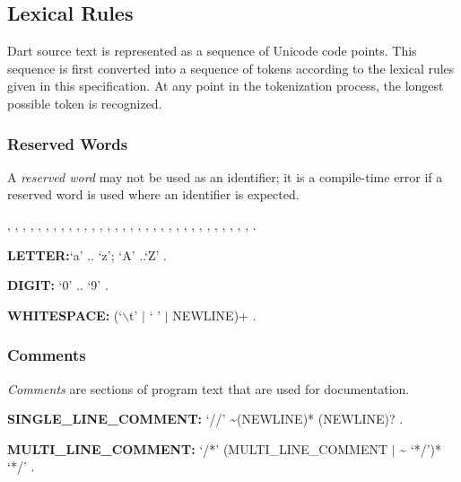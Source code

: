 \documentclass{article}
\begin{document}
\subsection{Lexical Rules}

\LMHash{}
Dart source text is represented as a sequence of Unicode code points.  This sequence is first converted into a sequence of tokens according to the lexical rules given in this specification.  At any point in the tokenization process, the longest possible token is recognized.

\subsubsection{Reserved Words} 

\LMHash{}
A {\em reserved word} may not be used as an identifier; it is a compile-time error if a reserved word is used where an identifier is expected.

\ASSERT{}, \BREAK{}, \CASE{}, \CATCH{}, \CLASS{}, \CONST{}, \CONTINUE{}, \DEFAULT{}, \DO{}, \ELSE{}, \ENUM{}, \EXTENDS{}, \FALSE{}, \FINAL{}, \FINALLY{}, \FOR{}, \IF{}, \IN{}, \IS{}, \NEW{}, \NULL{}, \RETHROW, \RETURN{}, \SUPER{}, \SWITCH{}, \THIS{}, \THROW{}, \TRUE{}, \TRY{}, \VAR{}, \VOID{}, \WHILE{}, \WITH{}.




\begin{grammar}
 {\bf LETTER:}`a' {\escapegrammar ..} `z';
     `A' {\escapegrammar ..}`Z'
    .

{\bf DIGIT:}
      `0' {\escapegrammar ..} `9'
    .

{\bf WHITESPACE:}
      (`$\backslash$t' $|$ ` ' $|$ NEWLINE)+
    .
\end{grammar}

\subsubsection{Comments}

\LMHash{}
{\em Comments} are sections of program text that are used for documentation.

\begin{grammar}{\bf SINGLE\_LINE\_COMMENT:}
      `//' \~{}(NEWLINE)* (NEWLINE)?
    .

{\bf MULTI\_LINE\_COMMENT:}
      `/*' (MULTI\_LINE\_COMMENT $|$ \~{} `*/')* `*/'
    .
 \end{grammar}
  
\end{document}
